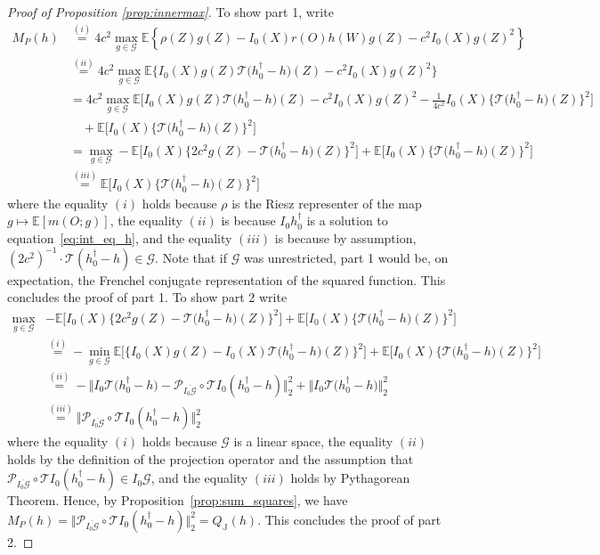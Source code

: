 \documentclass[twoside,11pt]{article}
\newcommand{\mc}{\mathcal}
\begin{document}
\begin{proof}[Proof of Proposition \ref{prop:innermax}]
To show part 1, write
\begin{align*}
M_P(h)
&\stackrel{(i)}{=}4c^2 \max_{g\in \mc{G}} \mathbb{E}\left\{\rho(Z)g(Z)-I_0(X)r(O)h(W)g(Z)-c^2I_0(X)g(Z)^2\right\}
\\
&\stackrel{(ii)}{=}4c^2 \max_{g\in \mc{G}} \mathbb{E}\Big\{I_0(X)g(Z)\mc{T}\big(h_{0}^\dag-h\big)(Z)-c^2I_0(X)g(Z)^2\Big\}
\\
&=4c^2 \max_{g\in \mc{G}} \mathbb{E}\Big[I_0(X)g(Z)\mc{T}\big(h_{0}^\dag-h\big)(Z)-c^2I_0(X)g(Z)^2-\frac{1}{4c^2}I_0(X)\big\{\mc{T}\big(h_{0}^\dag-h\big)(Z)\big\}^2\Big]
\\
& \quad +\mathbb{E}\Big[I_0(X)\big\{\mc{T}\big(h_{0}^\dag-h\big)(Z)\big\}^2\Big]
\\
&=\max_{g\in \mc{G}} -\mathbb{E}\Big[I_0(X)\big\{2c^2g(Z)-\mc{T}\big(h_{0}^\dag-h\big)(Z)\big\}^2\Big]
+\mathbb{E}\Big[I_0(X)\big\{\mc{T}\big(h_{0}^\dag-h\big)(Z)\big\}^2\Big]
\\
&\stackrel{(iii)}{=}\mathbb{E}\Big[I_0(X)\big\{\mc{T}\big(h_{0}^\dag-h\big)(Z)\big\}^2\Big]
\end{align*}
where the equality $(i)$ holds because $\rho$ is the Riesz representer of the map $g \mapsto \mathbb{E}\left[m(O;g)\right]$, the equality $(ii)$ is because $I_0 h_{0}^\dag$ is a solution to equation~\eqref{eq:int_eq_h}, and the equality $(iii)$ is because by assumption, $(2c^2)^{-1}\cdot\mc{T}(h_0^\dag-h)\in\mc{G}$. Note that if $\mc{G}$ was unrestricted, part 1 would be, on expectation, the Frenchel conjugate representation of the squared function.
This concludes the proof of part 1.
To show part 2 write
\begin{align*}
\max_{g\in \mc{G}}& -\mathbb{E}\Big[I_0(X)\big\{2c^2g(Z)-\mc{T}\big(h_{0}^\dag-h\big)(Z)\big\}^2\Big]
+\mathbb{E}\Big[I_0(X)\big\{\mc{T}\big(h_{0}^\dag-h\big)(Z)\big\}^2\Big]\\
&\stackrel{(i)}{=}-\min_{g\in \mc{G}} \mathbb{E}\Big[\big\{I_0(X)g(Z)-I_0(X)\mc{T}\big(h_{0}^\dag-h\big)(Z)\big\}^2\Big]
+\mathbb{E}\Big[I_0(X)\big\{\mc{T}\big(h_{0}^\dag-h\big)(Z)\big\}^2\Big]
\\
&\stackrel{(ii)}{=}-\big\Vert I_0\mc{T}\big(h_{0}^\dag-h\big) - \mc{P}_{\overline{I_0\mc{G}}}\circ \mc{T}I_0(h_0^\dag-h)\big\Vert_2^2 + \big\Vert I_0\mc{T}\big(h_{0}^\dag-h\big) \big\Vert_2^2
\\
&\stackrel{(iii)}{=}\big\Vert  \mc{P}_{\overline{I_0\mc{G}}}\circ \mc{T}I_0(h_0^\dag-h)\big\Vert_2^2
\end{align*}
where the equality $(i)$ holds because $\mc{G}$ is a linear space, the equality $(ii)$ holds by the definition of the projection operator and the assumption that $\mc{P}_{\overline{I_0\mc{G}}}\circ \mc{T}I_0(h_0^\dag-h)
\in I_0\mc{G}$, and the equality $(iii)$ holds by Pythagorean Theorem. Hence, by Proposition~\ref{prop:sum_squares}, we have
$ 
M_P(h)=\Vert  \mc{P}_{\overline{I_0\mc{G}}}\circ \mc{T}I_0(h_0^\dag-h)\Vert_2^2=Q_\mathbb{J}(h)$. This concludes the proof of part 2.
\end{proof}
\end{document}
